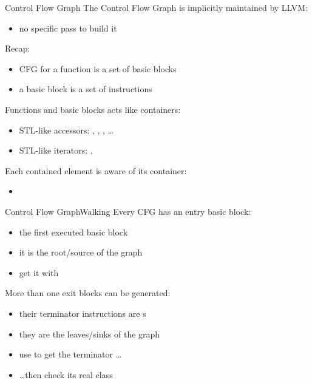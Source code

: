 \documentclass[10pt,mathserif]{beamer}
\begin{document}
\begin{frame}{Control Flow Graph}
The Control Flow Graph is implicitly maintained by LLVM:

\begin{itemize}
\item no specific pass to build it
\end{itemize}

\vfill
Recap:

\begin{itemize}
\item CFG for a function is a set of basic blocks
\item a basic block is a set of instructions
\end{itemize}

\vfill
Functions and basic blocks acts like containers:

\begin{itemize}
\item STL-like accessors: , ,
      , \ldots
\item STL-like iterators: , 
\end{itemize}

\vfill
Each contained element is aware of its container:

\begin{itemize}
\item {}
\end{itemize}
\end{frame}

\begin{frame}{Control Flow Graph}{Walking}
Every CFG has an entry basic block:

\begin{itemize}
\item the \alert{first} executed basic block
\item it is the \alert{root/source} of the graph
\item get it with 
\end{itemize}

\vfill
More than one exit blocks can be generated:

\begin{itemize}
\item their terminator instructions are s
\item they are the \alert{leaves/sinks} of the graph
\item use  to get the terminator
      \ldots
\item \ldots then check its real class
\end{itemize}
\end{frame}
\end{document}
